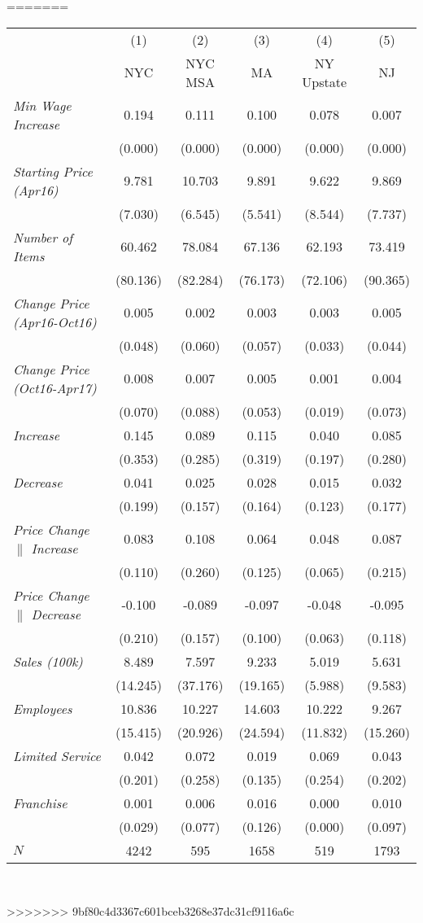 =======
\begin{center}
\begin{tabular}{lccccc}
\hline  & (1) & (2) & (3) & (4) & (5)\\
 & NYC & NYC MSA & MA & NY Upstate & NJ\\
\hline  \textit{Min Wage Increase}  & 0.194 & 0.111 & 0.100 & 0.078 & 0.007\\
  & (0.000) & (0.000) & (0.000) & (0.000) & (0.000)\\
 \textit{Starting Price (Apr16)}  & 9.781 & 10.703 & 9.891 & 9.622 & 9.869\\
  & (7.030) & (6.545) & (5.541) & (8.544) & (7.737)\\
 \textit{Number of Items}  & 60.462 & 78.084 & 67.136 & 62.193 & 73.419\\
  & (80.136) & (82.284) & (76.173) & (72.106) & (90.365)\\
 \textit{Change Price (Apr16-Oct16)}  & 0.005 & 0.002 & 0.003 & 0.003 & 0.005\\
  & (0.048) & (0.060) & (0.057) & (0.033) & (0.044)\\
 \textit{Change Price (Oct16-Apr17)}  & 0.008 & 0.007 & 0.005 & 0.001 & 0.004\\
  & (0.070) & (0.088) & (0.053) & (0.019) & (0.073)\\
 \textit{Increase}  & 0.145 & 0.089 & 0.115 & 0.040 & 0.085\\
  & (0.353) & (0.285) & (0.319) & (0.197) & (0.280)\\
 \textit{Decrease}  & 0.041 & 0.025 & 0.028 & 0.015 & 0.032\\
  & (0.199) & (0.157) & (0.164) & (0.123) & (0.177)\\
 \textit{Price Change $\|$ Increase}  & 0.083 & 0.108 & 0.064 & 0.048 & 0.087\\
  & (0.110) & (0.260) & (0.125) & (0.065) & (0.215)\\
 \textit{Price Change $\|$ Decrease}  & -0.100 & -0.089 & -0.097 & -0.048 & -0.095\\
  & (0.210) & (0.157) & (0.100) & (0.063) & (0.118)\\
 \textit{Sales (100k)}  & 8.489 & 7.597 & 9.233 & 5.019 & 5.631\\
  & (14.245) & (37.176) & (19.165) & (5.988) & (9.583)\\
 \textit{Employees} & 10.836 & 10.227 & 14.603 & 10.222 & 9.267\\
  & (15.415) & (20.926) & (24.594) & (11.832) & (15.260)\\
 \textit{Limited Service}  & 0.042 & 0.072 & 0.019 & 0.069 & 0.043\\
  & (0.201) & (0.258) & (0.135) & (0.254) & (0.202)\\
 \textit{Franchise}  & 0.001 & 0.006 & 0.016 & 0.000 & 0.010\\
  & (0.029) & (0.077) & (0.126) & (0.000) & (0.097)\\
\hline  $ N $  & 4242 & 595 & 1658 & 519 & 1793\\
\hline\end{tabular}\\
\end{center}
>>>>>>> 9bf80c4d3367c601bceb3268e37dc31cf9116a6c
